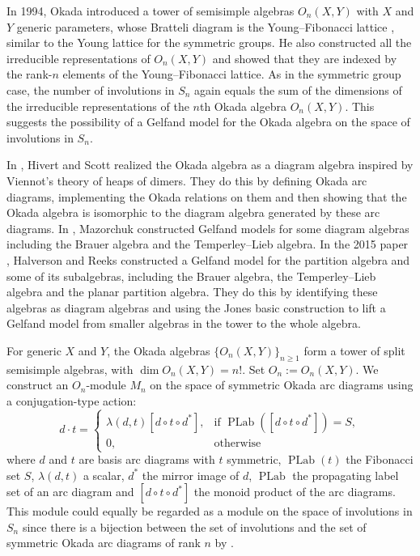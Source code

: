 \documentclass[12pt,reqno]{amsart}
\numberwithin{equation}{section}
\theoremstyle{definition}
\theoremstyle{definition}
\newcommand{\PLab}{\operatorname{PLab}}
\begin{document}
In 1994, Okada introduced a tower of semisimple algebras $O_n(X,Y)$ with $X$ and $Y$ generic parameters, whose Bratteli diagram is the Young--Fibonacci lattice \cite{Okada}, similar to the Young lattice for the symmetric groups. He also constructed all the irreducible representations of $O_n(X,Y)$ and showed that they are indexed by the rank-$n$ elements of the Young--Fibonacci lattice. As in the symmetric group case, the number of involutions in $S_n$ again equals the sum of the dimensions of the irreducible representations of the $n$th Okada algebra $O_n(X,Y)$. This suggests the possibility of a Gelfand model for the Okada algebra on the space of involutions in $S_n$. 


In \cite{Hivert-Scott,HivertScott}, Hivert and Scott realized the Okada algebra as a diagram algebra inspired by Viennot's theory of heaps of dimers. They do this by defining Okada arc diagrams, implementing the Okada relations on them and then showing that the Okada algebra is isomorphic to the diagram algebra generated by these arc diagrams. 
In \cite{Mazorchuk}, Mazorchuk constructed Gelfand models for some diagram algebras including the Brauer algebra and the Temperley--Lieb algebra.
In the 2015 paper \cite{HalversonReeks}, Halverson and Reeks constructed a Gelfand model for the partition algebra and some of its subalgebras, including the Brauer algebra, the Temperley--Lieb algebra and the planar partition algebra. They do this by identifying these algebras as diagram algebras and using the Jones basic construction to lift a Gelfand model from smaller algebras in the tower to the whole algebra.


For generic $X$ and $Y$, the Okada algebras $\{O_n(X,Y)\}_{n\geq 1}$ form a tower of split semisimple algebras, with $\dim O_n(X,Y)=n!$. Set $O_n:= O_n(X,Y)$. We construct an $O_n$-module $M_n$ on the space of symmetric Okada arc diagrams using a conjugation-type action:
\begin{equation*}
 d\cdot t=
\begin{cases}
\displaystyle \lambda(d,t)[d\circ t\circ d^*],
& \text{if } \PLab([d\circ t\circ d^*])=S,\\[6pt]
0,
& \text{otherwise}
\end{cases}
\end{equation*} where $d$ and $t$ are basis arc diagrams with $t$ symmetric, $\PLab(t)$ the Fibonacci set $S$, $\lambda(d,t)$ a scalar, $d^*$ the mirror image of $d$, $\PLab$ the propagating label set of an arc diagram and $[d\circ t\circ d^*]$ the monoid product of the arc diagrams. This module could equally be regarded as a module on the space of involutions in $S_n$ since there is a bijection between the set of involutions and the set of symmetric Okada arc diagrams of rank $n$ by \cite[Theorem 4.14]{HivertScott}. 
\end{document}
